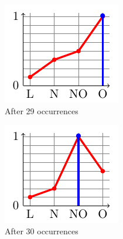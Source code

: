 \begin{figure}
\begin{subfigure}[b]{.15\linewidth}
\includegraphics[width=\linewidth]{plot_tikz/speed29.pdf}
\caption{After 29 occurrences}
\label{fig:i}
\end{subfigure}
\begin{subfigure}[b]{.15\linewidth}
\includegraphics[width=\linewidth]{plot_tikz/speed30.pdf}
\caption{After 30 occurrences}
\label{fig:l}
\end{subfigure}
\begin{subfigure}[b]{.15\linewidth}

\end{subfigure}
\end{figure}
